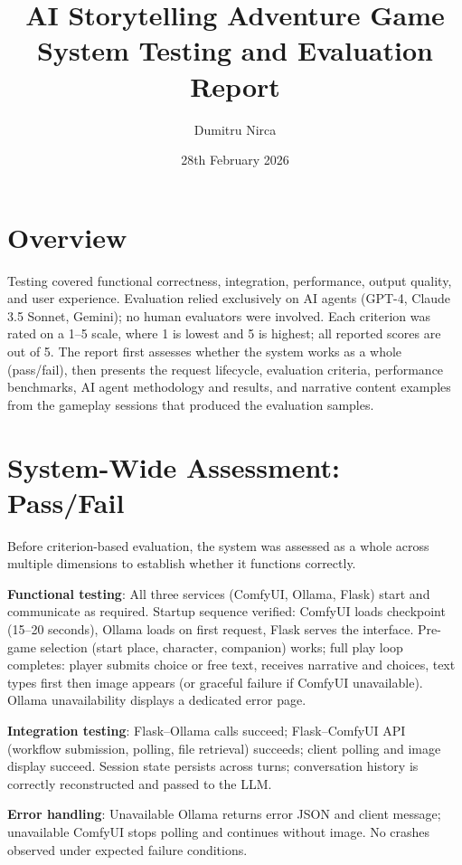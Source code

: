 \documentclass[12pt,a4paper]{article}
\title{AI Storytelling Adventure Game\\
\large System Testing and Evaluation Report}
\author{Dumitru Nirca}
\date{28th February 2026}
\begin{document}
\maketitle

\section{Overview}

Testing covered functional correctness, integration, performance, output quality, and user experience. Evaluation relied exclusively on AI agents (GPT-4, Claude 3.5 Sonnet, Gemini); no human evaluators were involved. Each criterion was rated on a 1--5 scale, where 1 is lowest and 5 is highest; all reported scores are out of 5. The report first assesses whether the system works as a whole (pass/fail), then presents the request lifecycle, evaluation criteria, performance benchmarks, AI agent methodology and results, and narrative content examples from the gameplay sessions that produced the evaluation samples.

\section{System-Wide Assessment: Pass/Fail}

Before criterion-based evaluation, the system was assessed as a whole across multiple dimensions to establish whether it functions correctly.

\textbf{Functional testing}: All three services (ComfyUI, Ollama, Flask) start and communicate as required. Startup sequence verified: ComfyUI loads checkpoint (15--20 seconds), Ollama loads on first request, Flask serves the interface. Pre-game selection (start place, character, companion) works; full play loop completes: player submits choice or free text, receives narrative and choices, text types first then image appears (or graceful failure if ComfyUI unavailable). Ollama unavailability displays a dedicated error page.

\textbf{Integration testing}: Flask--Ollama calls succeed; Flask--ComfyUI API (workflow submission, polling, file retrieval) succeeds; client polling and image display succeed. Session state persists across turns; conversation history is correctly reconstructed and passed to the LLM.

\textbf{Error handling}: Unavailable Ollama returns error JSON and client message; unavailable ComfyUI stops polling and continues without image. No crashes observed under expected failure conditions.
\end{document}
